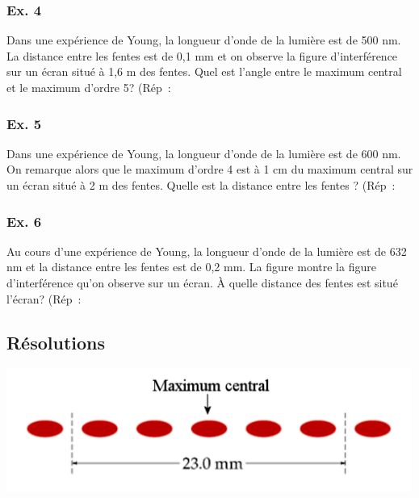 \subsubsection{Ex. 4}
Dans une expérience de Young, la longueur d'onde de la lumière est de
500 nm. La distance entre les fentes est de 0,1 mm et on observe la
figure d'interférence sur un écran situé à 1,6 m des fentes. Quel est
l'angle entre le maximum central et le maximum d'ordre 5? (Rép~:
\subsubsection{Ex. 5}
Dans une expérience de Young, la longueur d'onde de la lumière est de
600 nm.
On remarque alors que le maximum d'ordre 4 est à 1 cm du maximum central
sur un écran situé à 2 m des fentes. Quelle est la distance entre les
fentes\textbf{ }? (Rép~:

\subsubsection{Ex. 6}
Au cours d'une expérience de Young, la longueur d'onde de la lumière
est de 632 nm et la distance entre les fentes est de 0,2 mm. La figure montre la figure
d'interférence qu'on observe sur un écran. À quelle distance des fentes est situé
l'écran? (Rép~:

\subsection{Résolutions}
\includegraphics[width=13.259cm,height=4.045cm]{Pictures/100000010000059F000001B75001F99348A6D888.png}

